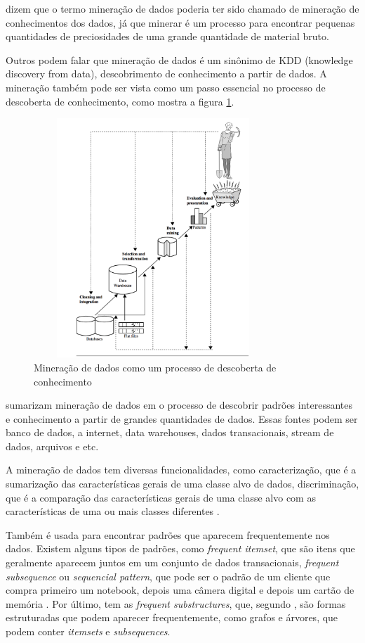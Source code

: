  dizem que o termo mineração de dados poderia ter sido chamado de mineração de conhecimentos dos dados, já que minerar é um processo para encontrar pequenas quantidades de preciosidades de uma grande quantidade de material bruto. 

Outros podem falar que mineração de dados é um sinônimo de KDD (knowledge discovery from data), descobrimento de conhecimento a partir de dados. A mineração também pode ser vista como um passo essencial no processo de descoberta de conhecimento, como mostra a figura \ref{kdd}. 

\begin{figure}[H]
\centering
\includegraphics[height=9cm, width=9cm]{imagens/kdd.png}
\caption{Mineração de dados como um processo de descoberta de conhecimento \citep{jmj}}
\label{kdd}
\end{figure}

\citeauthor{jmj} sumarizam mineração de dados em o processo de descobrir padrões interessantes e conhecimento a partir de grandes quantidades de dados. Essas fontes podem ser banco de dados, a internet, data warehouses, dados transacionais, stream de dados, arquivos e etc. 

A mineração de dados tem diversas funcionalidades, como caracterização, que é a sumarização das características gerais de uma classe alvo de dados, discriminação, que é a comparação das características gerais de uma classe alvo com as características de uma ou mais classes diferentes \citep{jmj}. 

Também é usada para encontrar padrões que aparecem frequentemente nos dados. Existem alguns tipos de padrões, como \textit{frequent itemset}, que são itens que geralmente aparecem juntos em um conjunto de dados transacionais, \textit{frequent subsequence} ou \textit{sequencial pattern}, que pode ser o padrão de um cliente que compra primeiro um notebook, depois uma câmera digital e depois um cartão de memória \citep{jmj}. Por último, tem as \textit{frequent substructures}, que, segundo \citeauthor{jmj}, são formas estruturadas que podem aparecer frequentemente, como grafos e árvores, que podem conter \textit{itemsets} e \textit{subsequences}.

